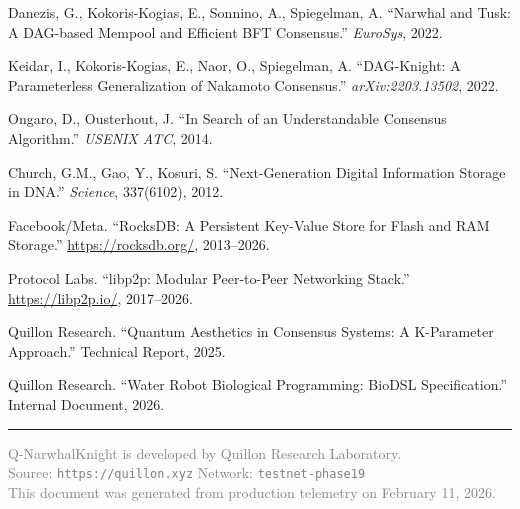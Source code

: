 \documentclass[11pt,a4paper,twocolumn]{article}
\begin{document}
\begin{enumerate}[nosep,leftmargin=*,label={[\arabic*]}]
    \item Danezis, G., Kokoris-Kogias, E., Sonnino, A., Spiegelman, A.
          ``Narwhal and Tusk: A DAG-based Mempool and Efficient BFT Consensus.''
          \textit{EuroSys}, 2022.
    \item Keidar, I., Kokoris-Kogias, E., Naor, O., Spiegelman, A.
          ``DAG-Knight: A Parameterless Generalization of Nakamoto Consensus.''
          \textit{arXiv:2203.13502}, 2022.
    \item Ongaro, D., Ousterhout, J. ``In Search of an Understandable Consensus
          Algorithm.'' \textit{USENIX ATC}, 2014.
    \item Church, G.M., Gao, Y., Kosuri, S. ``Next-Generation Digital Information
          Storage in DNA.'' \textit{Science}, 337(6102), 2012.
    \item Facebook/Meta. ``RocksDB: A Persistent Key-Value Store for Flash and
          RAM Storage.'' \url{https://rocksdb.org/}, 2013--2026.
    \item Protocol Labs. ``libp2p: Modular Peer-to-Peer Networking Stack.''
          \url{https://libp2p.io/}, 2017--2026.
    \item Quillon Research. ``Quantum Aesthetics in Consensus Systems: A
          K-Parameter Approach.'' Technical Report, 2025.
    \item Quillon Research. ``Water Robot Biological Programming: BioDSL
          Specification.'' Internal Document, 2026.
\end{enumerate}

\vspace{1em}
\noindent\rule{\columnwidth}{0.4pt}
\begin{center}
\scriptsize
\textcolor{gray}{Q-NarwhalKnight is developed by Quillon Research Laboratory.\\
Source: \texttt{https://quillon.xyz} \quad Network: \texttt{testnet-phase19}\\
This document was generated from production telemetry on February 11, 2026.}
\end{center}
\end{document}
